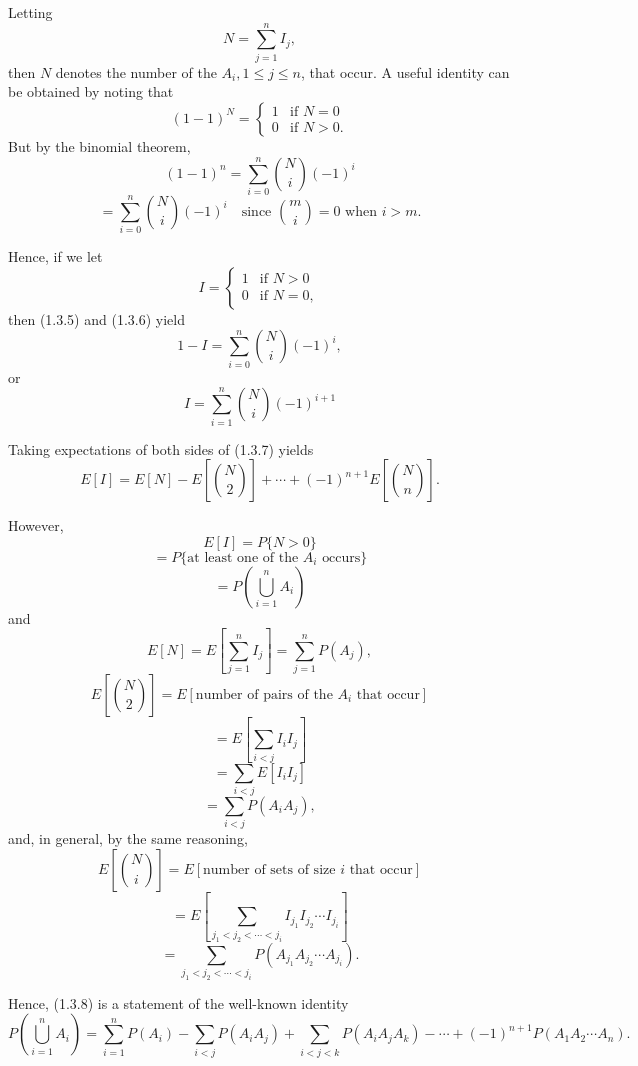 \documentclass[lang=cn,10pt]{elegantbook}
\begin{document}
Letting
\[
N = \sum_{j=1}^{n} I_j,
\]
then \(N\) denotes the number of the \(A_i, 1 \leq j \leq n\), that occur. A useful identity can be obtained by noting that
\begin{equation}
(1 - 1)^N = \begin{cases}
1 & \text{if } N = 0 \\
0 & \text{if } N > 0.
\end{cases}
\end{equation}
But by the binomial theorem,
\begin{equation}
(1 - 1)^n = \sum_{i=0}^{n} \binom{N}{i} (-1)^i
\end{equation}
\[
= \sum_{i=0}^{n} \binom{N}{i} (-1)^i \quad \text{since } \binom{m}{i} = 0 \text{ when } i > m.
\]

Hence, if we let
\[
I = \begin{cases}
1 & \text{if } N > 0 \\
0 & \text{if } N = 0,
\end{cases}
\]
then (1.3.5) and (1.3.6) yield
\[
1 - I = \sum_{i=0}^{n} \binom{N}{i} (-1)^i,
\]
or
\begin{equation}
I = \sum_{i=1}^{n} \binom{N}{i} (-1)^{i+1}
\end{equation}

Taking expectations of both sides of (1.3.7) yields
\begin{equation}
E[I] = E[N] - E\left[\binom{N}{2}\right] + \cdots + (-1)^{n+1} E\left[\binom{N}{n}\right].
\end{equation}

However,
\[
E[I] = P\{N > 0\}
\]
\[
= P\{\text{at least one of the } A_i \text{ occurs}\}
\]
\[
= P\left(\bigcup_{i=1}^{n} A_i\right)
\]
and
\[
E[N] = E\left[\sum_{j=1}^{n} I_j\right] = \sum_{j=1}^{n} P(A_j),
\]
\[
E\left[\binom{N}{2}\right] = E[\text{number of pairs of the } A_i \text{ that occur}]
\]
\[
= E\left[\sum_{i<j} I_i I_j\right]
\]
\[
= \sum_{i<j} E[I_i I_j]
\]
\[
= \sum_{i<j} P(A_i A_j),
\]
and, in general, by the same reasoning,
\[
E\left[\binom{N}{i}\right] = E[\text{number of sets of size } i \text{ that occur}]
\]
\[
= E\left[\sum_{j_1 < j_2 < \cdots < j_i} I_{j_1} I_{j_2} \cdots I_{j_i}\right]
\]
\[
= \sum_{j_1 < j_2 < \cdots < j_i} P(A_{j_1} A_{j_2} \cdots A_{j_i}).
\]

Hence, (1.3.8) is a statement of the well-known identity
\[
P\left(\bigcup_{i=1}^{n} A_i\right) = \sum_{i=1}^{n} P(A_i) - \sum_{i<j} P(A_i A_j) + \sum_{i<j<k} P(A_i A_j A_k) - \cdots + (-1)^{n+1} P(A_1 A_2 \cdots A_n).
\]
\end{document}
